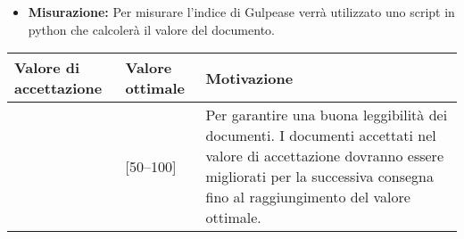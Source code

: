 \begin{itemize}
\item \textbf{Misurazione:} Per misurare l'indice di Gulpease verrà utilizzato uno script in python che calcolerà il valore del documento.
\end{itemize}

\begin{center}

		\begin{tabular}{|P{2.5cm}|P{2.5cm}|P{6cm}|}
		\hline
			\textbf{Valore di accettazione}	& \textbf{Valore ottimale} & \textbf{Motivazione} \\
			\hline
			[40 -- 100] & [50--100] &	Per garantire una buona leggibilità dei documenti. I documenti accettati nel valore di accettazione dovranno essere migliorati per la successiva consegna fino al raggiungimento del valore ottimale. \\
			\hline
			\end{tabular}
\end{center}